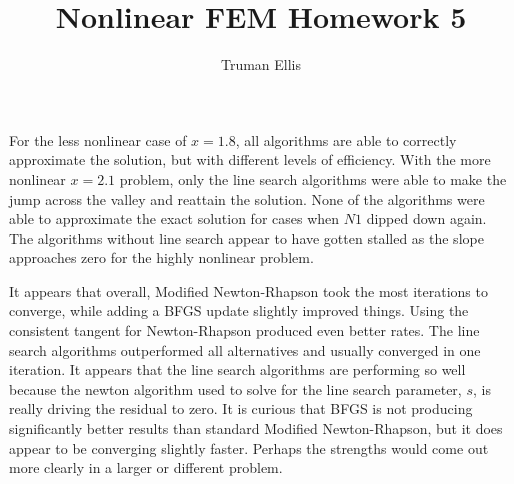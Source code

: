 \documentclass[12pt]{article}
\title{Nonlinear FEM Homework 5}
\author{Truman Ellis}
\date{}
\begin{document}
\maketitle
For the less nonlinear case of $x=1.8$, all algorithms are able to correctly
approximate the solution, but with different levels of efficiency. With the
more nonlinear $x=2.1$ problem, only the line search algorithms were able to
make the jump across the valley and reattain the solution. None of the
algorithms were able to approximate the exact solution for cases when $N1$
dipped down again. The algorithms without line search appear to have gotten
stalled as the slope approaches zero for the highly nonlinear problem. 

It appears that overall, Modified Newton-Rhapson took the most iterations to
converge, while adding a BFGS update slightly improved things. Using the
consistent tangent for Newton-Rhapson produced even better rates. The line
search algorithms outperformed all alternatives and usually converged in one
iteration. It appears that the line search algorithms are performing so well
because the newton algorithm used to solve for the line search parameter, $s$,
is really driving the residual to zero. It is curious that BFGS is not
producing significantly better results than standard Modified Newton-Rhapson,
but it does appear to be converging slightly faster. Perhaps the strengths
would come out more clearly in a larger or different problem.
\end{document}
